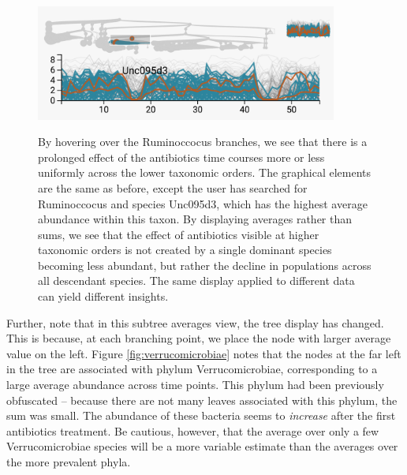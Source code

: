 \documentclass{report}
\begin{document}
\begin{figure}

{\centering \includegraphics[width=375px]{figure/treelapse/ruminococcus}}
\caption{By hovering over the Ruminoccocus branches, we see that there is a
  prolonged effect of the antibiotics time courses more or less uniformly across
  the lower taxonomic orders. The graphical elements are the same as before,
  except the user has searched for Ruminoccocus and species Unc095d3, which has
  the highest average abundance within this taxon. By displaying averages rather
  than sums, we see that the effect of antibiotics visible at higher taxonomic
  orders is not created by a single dominant species becoming less abundant, but
  rather the decline in populations across all descendant species. The same
  display applied to different data can yield different
  insights.}\label{fig:ruminococcus}
\end{figure}

Further, note that in this subtree averages view, the tree display has changed.
This is because, at each branching point, we place the node with larger average
value on the left. Figure \ref{fig:verrucomicrobiae} notes that the nodes at
the far left in the tree are associated with phylum Verrucomicrobiae,
corresponding to a large average abundance across time points. This phylum had
been previously obfuscated -- because there are not many leaves associated with
this phylum, the sum was small. The abundance of these bacteria seems to
\emph{increase} after the first antibiotics treatment. Be cautious, however,
that the average over only a few Verrucomicrobiae species will be a more
variable estimate than the averages over the more prevalent phyla.
\end{document}
